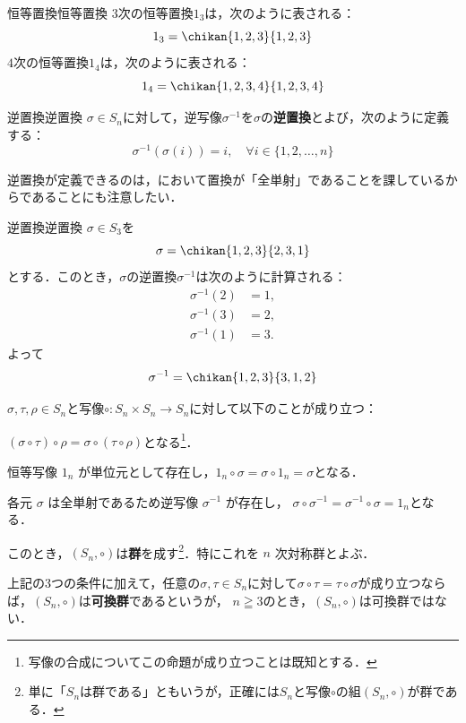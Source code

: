 \begin{example}{恒等置換}{恒等置換}
  $3$次の恒等置換$1_3$は，次のように表される：
  \[
  1_3 = \chikan{1, 2, 3}{1, 2, 3}
  \]
  $4$次の恒等置換$1_4$は，次のように表される：
  \[
  1_4 = \chikan{1, 2, 3, 4}{1, 2, 3, 4}
  \]
\end{example}

\begin{definition}{逆置換}{逆置換}
  $\sigma\in S_n$に対して，逆写像$\sigma^{-1}$を$\sigma$の\textbf{逆置換}とよび，次のように定義する：
  \[
  \sigma^{-1}(\sigma(i)) = i, \quad \forall i \in \{1, 2, \dots, n\}
  \]
\end{definition}

逆置換が定義できるのは，において置換が「全単射」であることを課しているからであることにも注意したい．

\begin{example}{逆置換}{逆置換}
  $\sigma \in S_3$を
  \[
  \sigma = \chikan{1, 2, 3}{2, 3, 1}
  \]
  とする．このとき，$\sigma$の逆置換$\sigma^{-1}$は次のように計算される：
  \begin{align*}
    \sigma^{-1}(2) &= 1, \\
    \sigma^{-1}(3) &= 2, \\
    \sigma^{-1}(1) &= 3.
  \end{align*}
  よって
  \[
  \sigma^{-1} = \chikan{1, 2, 3}{3, 1, 2}
  \]
\end{example}


\begin{mycolumn}
$\sigma, \tau, \rho \in S_n$と写像$\circ \colon S_n \times S_n \to S_n$に対して以下のことが成り立つ：
  
  \begin{description}[align=left,labelwidth=6em]
    \item[結合律] $(\sigma \circ \tau) \circ \rho = \sigma \circ (\tau \circ \rho) $となる\footnote{写像の合成についてこの命題が成り立つことは既知とする．}．\label{item:結合律}
    
    \item[単位元の存在] 恒等写像 $1_n$ が単位元として存在し，$1_n \circ \sigma = \sigma \circ 1_n = \sigma $となる．\label{item:単位元の存在}
    
    \item[逆元の存在] 各元 $\sigma$ は全単射であるため逆写像 $\sigma^{-1}$ が存在し，
    $\sigma \circ \sigma ^{-1} = \sigma ^{-1} \circ \sigma = 1_n $となる．\label{item:逆元の存在}
  \end{description}
  
  このとき，$(S_n,\circ)$は\textbf{群}を成す\footnote{単に「$S_n$は群である」ともいうが，正確には$S_n$と写像$\circ$の組$(S_n,\circ)$が群である．}．特にこれを $n$ 次対称群とよぶ．

   上記の3つの条件に加えて，任意の$\sigma, \tau \in S_n$に対して$\sigma \circ \tau = \tau \circ \sigma $が成り立つならば，$(S_n,\circ)$は\textbf{可換群}であるというが，
  $n \geqq 3$のとき，$(S_n,\circ)$は可換群ではない．
  \end{mycolumn}

